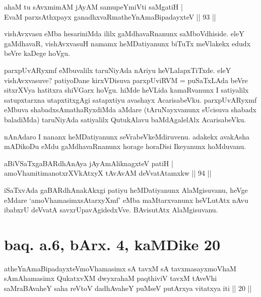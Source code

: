 \begin{shl}
ahaM tu sAvxmimAM jAyAM samupeYmiVti saMgatiH | \\
EvaM parxsAthxpayx ganadhxvaRmatheYnAmaBipadayxteV \hfill|| 93 || 
\end{shl}

\begin{artha}
vishAvxvasu eMba hesariniMda ililx gaMdhavaRnanunx saMboVdhiside. eleY 
gaMdhavaR, vishAvxvasuH namamx heMDatiyanunx biTuTx meVlakekx edudx 
beVre kaDege hoVgu.
\end{artha}

\begin{artha}
parxpUvARyxmf eMbuvalilx taruNiyAda nAriyu heVLalapxTiTxde. eleY 
vishAvxvasuve? patiyoDane kirxVDisuva parxpUviRVM = puSaTxLAda beVre 
sitxrXVya hatitxra shiVGarx hoVgu. hiMde heVLida kamaRvanunx I 
satiyalilx satupxtarxna utapxtitxgAgi satapxtiyu avashayx 
AcarisabeVku. parxpUvARyxmf eMbuva shabadxsAmathaRyxdiMda aMdare 
(tAruNayxvanunx sUcisuva shabadx baladiMda) taruNiyAda satiyalilx 
QutukAlavu baMdAgalelAlx AcarisabeVku.
\end{artha}

\begin{artha}
nAnAdaro I nananx heMDatiyanunx seVrabeVkeMdiruvenu. adakekx avakAsha 
mADikoDu eMdu gaMdhavaRnanunx horage horaDisi Ikeyanunx hoMduvanu.
\end{artha}

\begin{shl}
aBiVSaTxgaBARdhAnAya jAyAmAliknagxteV patiH | \\
amoV\s hamitimanotxrXVkAtxyX tAvAvAM deVvatAtamxkw \hfill|| 94 || 
\end{shl}

\begin{artha}
iSaTxvAda gaBARdhAnakAkxgi patiyu heMDatiyanunx AlaMgisuvanu, heVge 
eMdare `amoVhamasimxsAtarxyXmf' eMba maMtarxvanunx heVLutAtx nAvu 
ibabxrU deVvatA savxrUpavAgidedxVve. BAvisutAtx AlaMgisuvanu.
\end{artha}

\section*{baq. a.6, bArx. 4, kaMDike 20}

\begin{shl}
atheYnAmaBipadayxteV\s moV\s hamasimx sA tavxM sA tavxmasayxmoV\s haM sAmAhamasimx QukatxvXM dwyxrahaM paqthiviV tavxM tAveVhi saMraBAvaheY saha reVtoV dadhAvaheY puMseV putArxya vitatxya iti || 20 ||
\end{shl}

